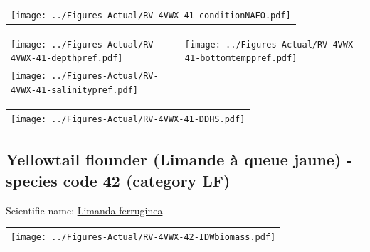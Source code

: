 \documentclass[12pt]{article}\usepackage[]{graphicx}\usepackage[]{color}
\begin{document}
\vspace{1cm}
\begin{minipage}{1.0\textwidth}
 \begin{tabular}{c}
\texttt{[image: ../Figures-Actual/RV-4VWX-41-conditionNAFO.pdf]} \\ 
\end{tabular} 
\end{minipage}
\clearpage
\begin{minipage}{1.0\textwidth}
 \begin{tabular}[t]{m{3in}m{3in}}
\texttt{[image: ../Figures-Actual/RV-4VWX-41-depthpref.pdf]} & 
\texttt{[image: ../Figures-Actual/RV-4VWX-41-bottomtemppref.pdf]} \\ 
\texttt{[image: ../Figures-Actual/RV-4VWX-41-salinitypref.pdf]} & 
 \\ 
\end{tabular} 
\end{minipage}
\newline

\vspace{1cm}
\begin{minipage}{1.0\textwidth}
 \begin{tabular}{c}
\texttt{[image: ../Figures-Actual/RV-4VWX-41-DDHS.pdf]} \\ 
\end{tabular} 
\end{minipage}
\clearpage

\renewcommand\thefigure{\thesubsection\Alph{figure}}

\setcounter{figure}{0}

\hypertarget{sec:42}{%
\subsection{Yellowtail flounder (Limande à queue jaune) - species code 42 (category LF)}\label{sec:42}}

  


Scientific name: \href{http://www.marinespecies.org/aphia.php?p=taxdetails\&id=158879}{Limanda ferruginea} \newline
\begin{minipage}{1.0\textwidth}
 \begin{tabular}{c}
\texttt{[image: ../Figures-Actual/RV-4VWX-42-IDWbiomass.pdf]} \\ 
\end{tabular} 
\end{minipage}
\newline
\end{document}
